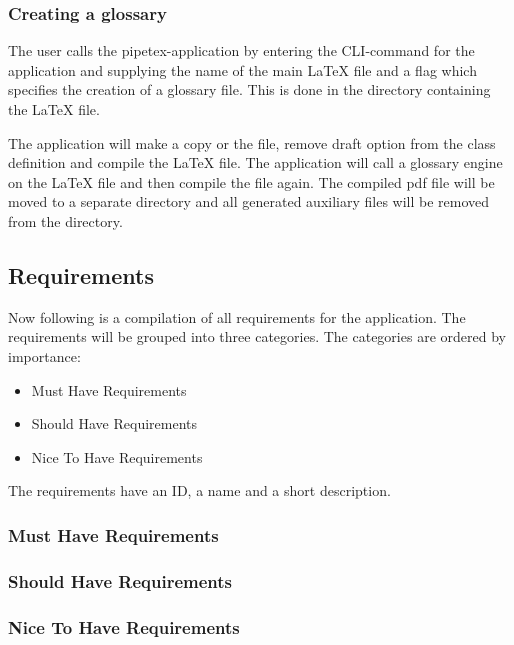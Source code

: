 \subsubsection*{Creating a glossary}
The user calls the pipetex-application by entering the CLI-command for the
application and supplying the name of the main {\LaTeX} file and a flag which
specifies the creation of a glossary file.  This is done in the directory
containing the {\LaTeX} file.

The application will make a copy or the file, remove draft option from the
class definition and compile the {\LaTeX} file. The application will call a
glossary engine on the {\LaTeX} file and then compile the file again. The
compiled pdf file will be moved to a separate directory and all generated
auxiliary files will be removed from the directory.

\subsection{Requirements}\label{sec:requirements}
Now following is a compilation of all requirements for the application.  The
requirements will be grouped into three categories.  The categories are ordered
by importance:

\begin{itemize}
    \item Must Have Requirements
    \item Should Have Requirements
    \item Nice To Have Requirements
\end{itemize}

The requirements have an ID, a name and a short description.


\subsubsection{Must Have Requirements}\label{sec:must_have_requirements}
\subsubsection{Should Have Requirements}\label{sec:should_have_requirements}
\subsubsection{Nice To Have Requirements}\label{sec:nice_to_have_requirements}
